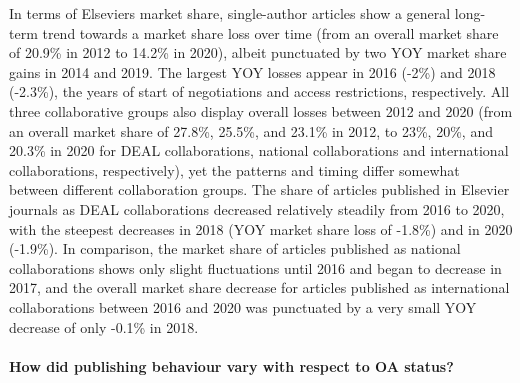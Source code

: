 \documentclass[
]{article}
\begin{document}
In terms of Elsevier\textquotesingle s market share, single-author articles show a general long-term trend towards a market share loss over time (from an overall market share of 20.9\% in 2012 to 14.2\% in 2020), albeit punctuated by two YOY market share gains in 2014 and 2019. The largest YOY losses appear in 2016 (-2\%) and 2018 (-2.3\%), the years of start of negotiations and access restrictions, respectively. All three collaborative groups also display overall losses between 2012 and 2020 (from an overall market share of 27.8\%, 25.5\%, and 23.1\% in 2012, to 23\%, 20\%, and 20.3\% in 2020 for DEAL collaborations, national collaborations and international collaborations, respectively), yet the patterns and timing differ somewhat between different collaboration groups. The share of articles published in Elsevier journals as DEAL collaborations decreased relatively steadily from 2016 to 2020, with the steepest decreases in 2018 (YOY market share loss of -1.8\%) and in 2020 (-1.9\%). In comparison, the market share of articles published as national collaborations shows only slight fluctuations until 2016 and began to decrease in 2017, and the overall market share decrease for articles published as international collaborations between 2016 and 2020 was punctuated by a very small YOY decrease of only -0.1\% in 2018.

\hypertarget{how-did-publishing-behaviour-vary-with-respect-to-oa-status}{%
\paragraph{How did publishing behaviour vary with respect to OA status?}\label{how-did-publishing-behaviour-vary-with-respect-to-oa-status}}
\end{document}
